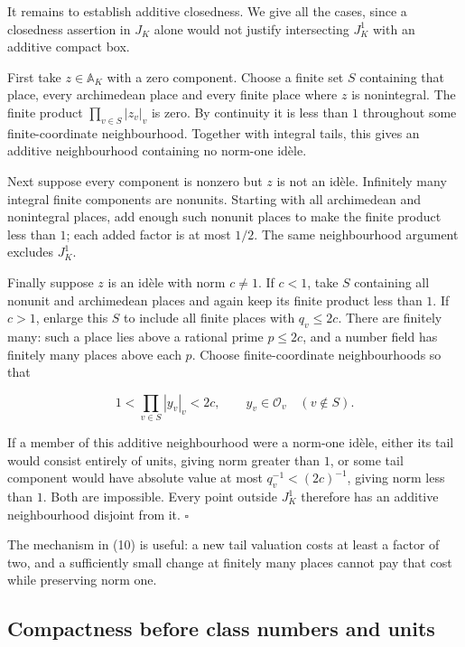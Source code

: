 \documentclass[
  english,
  11pt,
  a4paper,
]{article}
\begin{document}
It remains to establish additive closedness. We give all the cases,
since a closedness assertion in \(J_K\) alone would not justify
intersecting \(J_K^1\) with an additive compact box.

First take \(z\in\mathbb A_K\) with a zero component. Choose a finite
set \(S\) containing that place, every archimedean place and every
finite place where \(z\) is nonintegral. The finite product
\(\prod_{v\in S}|z_v|_v\) is zero. By continuity it is less than \(1\)
throughout some finite-coordinate neighbourhood. Together with integral
tails, this gives an additive neighbourhood containing no norm-one
idèle.

Next suppose every component is nonzero but \(z\) is not an idèle.
Infinitely many integral finite components are nonunits. Starting with
all archimedean and nonintegral places, add enough such nonunit places
to make the finite product less than \(1\); each added factor is at most
\(1/2\). The same neighbourhood argument excludes \(J_K^1\).

Finally suppose \(z\) is an idèle with norm \(c\ne1\). If \(c<1\), take
\(S\) containing all nonunit and archimedean places and again keep its
finite product less than \(1\). If \(c>1\), enlarge this \(S\) to
include all finite places with \(q_v\leq 2c\). There are finitely many:
such a place lies above a rational prime \(p\leq 2c\), and a number
field has finitely many places above each \(p\). Choose
finite-coordinate neighbourhoods so that

\[1<\prod_{v\in S}|y_v|_v<2c,
\qquad y_v\in\mathcal O_v\quad(v\notin S).
\tag{11}\]

If a member of this additive neighbourhood were a norm-one idèle, either
its tail would consist entirely of units, giving norm greater than
\(1\), or some tail component would have absolute value at most
\(q_v^{-1}<(2c)^{-1}\), giving norm less than \(1\). Both are
impossible. Every point outside \(J_K^1\) therefore has an additive
neighbourhood disjoint from it. \(\square\)

The mechanism in (10) is useful: a new tail valuation costs at least a
factor of two, and a sufficiently small change at finitely many places
cannot pay that cost while preserving norm one.

\subsection{Compactness before class numbers and
units}\label{NT-ADL-03--compactness-before-class-numbers-and-units}
\end{document}
